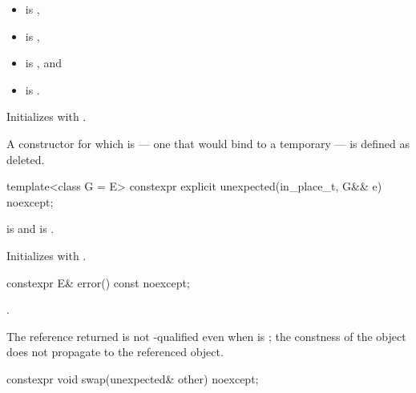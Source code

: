 \begin{itemdescr}
\pnum
\constraints
\begin{itemize}
\item {} is ,
\item {} is ,
\item {} is , and
\item {} is .
\end{itemize}

\pnum
\effects
Initializes  with .

\pnum
\remarks
A constructor for which  is  — one that would bind  to a temporary — is defined as deleted.
\end{itemdescr}

%
\begin{itemdecl}
template<class G = E>
  constexpr explicit unexpected(in_place_t, G&& e) noexcept;
\end{itemdecl}

\begin{itemdescr}
\pnum
\constraints
{} is  and  is .

\pnum
\effects
Initializes  with .
\end{itemdescr}

%
\begin{itemdecl}
constexpr E& error() const noexcept;
\end{itemdecl}

\begin{itemdescr}
\pnum
\returns
{}.

\pnum
\remarks
The reference returned is not -qualified even when  is ; the constness of the  object does not propagate to the referenced object.
\end{itemdescr}

%
\begin{itemdecl}
constexpr void swap(unexpected& other) noexcept;
\end{itemdecl}

